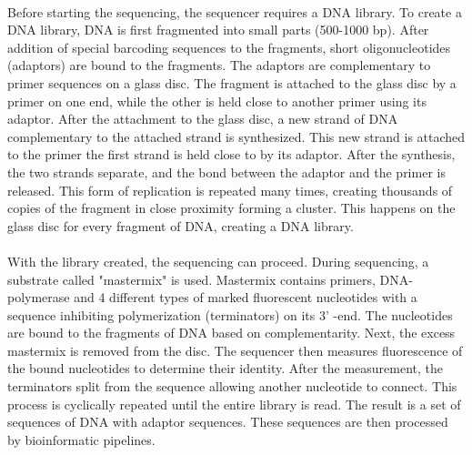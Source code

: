 \paragraph*{}
Before starting the sequencing, the sequencer requires a DNA library. To create a DNA library, DNA is first fragmented into small parts (500-1000 bp). After addition of special barcoding sequences to the fragments, short oligonucleotides (adaptors) are bound to the fragments. The adaptors are complementary to primer sequences on a glass disc. The fragment is attached to the glass disc by a primer on one end, while the other is held close to another primer using its adaptor. After the attachment to the glass disc, a new strand of DNA complementary to the attached strand is synthesized. This new strand is attached to the primer the first strand is held close to by its adaptor. After the synthesis, the two strands separate, and the bond between the adaptor and the primer is released. This form of replication is repeated many times, creating thousands of copies of the fragment in close proximity forming a cluster. This happens on the glass disc for every fragment of DNA, creating a DNA library.
\paragraph*{}
With the library created, the sequencing can proceed. During sequencing, a substrate called "mastermix" is used. Mastermix contains primers, DNA-polymerase and 4 different types of marked fluorescent nucleotides with a sequence inhibiting polymerization (terminators) on its 3' -end. The nucleotides are bound to the fragments of DNA based on complementarity. Next, the excess mastermix is removed from the disc. The sequencer then measures fluorescence of the bound nucleotides to determine their identity. After the measurement, the terminators split from the sequence allowing another nucleotide to connect. This process is cyclically repeated until the entire library is read. The result is a set of sequences of DNA with adaptor sequences. These sequences are then processed by bioinformatic pipelines.
